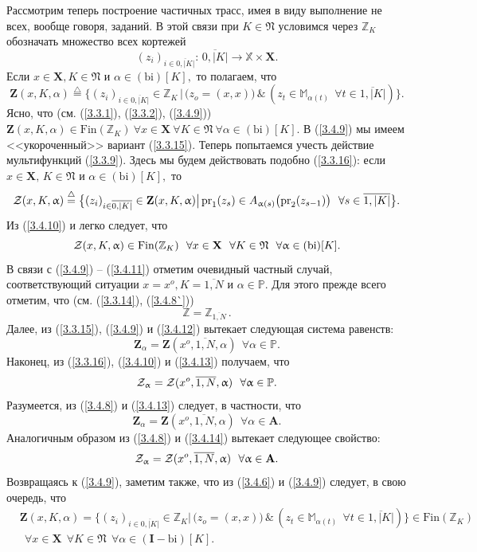 \documentclass[12pt]{report}
\newcommand{\bfn}{\begin{equation}}
\newcommand{\efn}{\end{equation}}
\newcommand{\df}{\stackrel{\triangle}{=}}
\newcommand{\ov}{\overline}
\newcommand{\al}{\alpha}
\newcommand{\fa}{\forall}
\newcommand{\cz}{{\cal Z}}
\newcommand{\bbz}{{\mathbb Z}}
\newcommand{\bbm}{{\mathbb M}}
\newcommand{\bbx}{{\mathbb X}}
\newcommand{\bbp}{{\mathbb P}}
\begin{document}
Рассмотрим теперь построение частичных трасс, имея в виду выполнение не всех,
вообще говоря, заданий. В этой связи при $K\in\mathfrak{N}$ условимся через $\bbz_K$
обозначать множество всех кортежей
\bfn\label{3.4.8`}
(z_i)_{i\in \ov{0,|K|}}:\,\ov{0,|K|} \longrightarrow \bbx \times \mathbf{X}.
\efn
Если $x\in \mathbf{X}, K\in \mathfrak{N}$ и $\al\in (\mathrm{bi})[K],$ то
полагаем, что
\bfn\label{3.4.9}
\mathbf{Z}(x,K,\al) \df \{(z_i)_{i\in \ov{0,|K|}}\in \bbz_K\,|\,\bigl(z_o=
(x,x)\bigl)\,\&\,(z_t\in \bbm_{\al(t)}\ \ \fa t\in \ov{1,|K|})\}.
\efn
Ясно, что (см. (\ref{3.3.1}), (\ref{3.3.2}), (\ref{3.4.9})) $\mathbf{Z}(x,K,\al)
\in \mathrm{Fin}(\bbz_K)\  \fa x\in \mathbf{X}\  \fa K\in \mathfrak{N}\  \fa
\al\in (\mathrm{bi})[K].$ В (\ref{3.4.9}) мы имеем <<укороченный>> вариант
(\ref{3.3.15}). Теперь попытаемся учесть действие мультифункций (\ref{3.3.9}).
Здесь мы будем действовать подобно (\ref{3.3.16}): если $x\in \mathbf{X},\, K\in
\mathfrak{N}$ и $\al\in (\mathrm{bi})[K],$ то
\bfn\label{3.4.10}\cz(x,K,\al) \df \bigl\{(z_i)_{i\in\ov{0,|K|}}\in \mathbf{Z}
(x,K,\al) \bigl|\,\mathrm{pr}_1(z_s)\in A_{\al(s)}\bigl(\mathrm{pr}_2(z_{s-1})
\bigl)\ \ \fa s\in \ov{1,|K|}\bigl\}.
\efn
Из (\ref{3.4.10}) и \cite[(3.21)]{Cha3`} легко следует, что
\bfn\label{3.4.11}\cz(x,K,\al) \in \mathrm{Fin}(\bbz_K)\ \ \fa x\in
\mathbf{X}\ \ \fa K\in \mathfrak{N}\ \ \fa \al\in (\mathrm{bi})[K].
\efn
В связи с (\ref{3.4.9}) -- (\ref{3.4.11}) отметим очевидный частный случай,
соответствующий ситуации $x = x^o, K = \ov{1,N}$ и $\al\in \bbp.$ Для этого
прежде всего отметим, что (см. (\ref{3.3.14}), (\ref{3.4.8`}))
\bfn\label{3.4.12}\bbz = \bbz_{\ov{1,N}}\,.
\efn
Далее, из (\ref{3.3.15}), (\ref{3.4.9}) и (\ref{3.4.12}) вытекает следующая
система равенств:
\bfn\label{3.4.13}
\mathbf{Z}_\al = \mathbf{Z}(x^o,\ov{1,N},\al) \ \ \fa \al\in \bbp.
\efn
Наконец, из (\ref{3.3.16}), (\ref{3.4.10}) и (\ref{3.4.13})  получаем, что
\bfn\label{3.4.14}\cz_\al = \cz(x^o,\ov{1,N},\al) \ \ \fa \al\in \bbp.
\efn
Разумеется, из (\ref{3.4.8}) и (\ref{3.4.13}) следует, в частности, что
\bfn\label{3.4.15}
\mathbf{Z}_\al = \mathbf{Z}(x^o,\ov{1,N},\al) \ \ \fa \al\in \mathbf{A}.
\efn
Аналогичным образом из (\ref{3.4.8}) и (\ref{3.4.14}) вытекает следующее
свойство:
\bfn\label{3.4.16}\cz_\al = \cz(x^o,\ov{1,N},\al) \ \ \fa \al\in \mathbf{A}.
\efn
Возвращаясь к (\ref{3.4.9}), заметим также, что из (\ref{3.4.6}) и (\ref{3.4.9})
следует, в свою очередь, что
\begin{eqnarray}
&\mathbf{Z}(x,K,\al) = \bigl\{(z_i)_{i\in \ov{0,|K|}} \in \bbz_K\bigl|\,\bigl(z_o =
(x,x)\bigl)\,\&\,(z_t\in \bbm_{\al(t)}\ \ \fa t\in \ov{1,|K|})\bigl\}\in \mathrm{Fin}
(\bbz_K)
&\nonumber\\
&\ \ \fa x\in \mathbf{X}\ \ \fa K\in \mathfrak{N}\ \ \fa \al\in (\mathbf{I}-\mathrm{bi})[K].
&\label{3.4.17}
\end{eqnarray}
\end{document}
